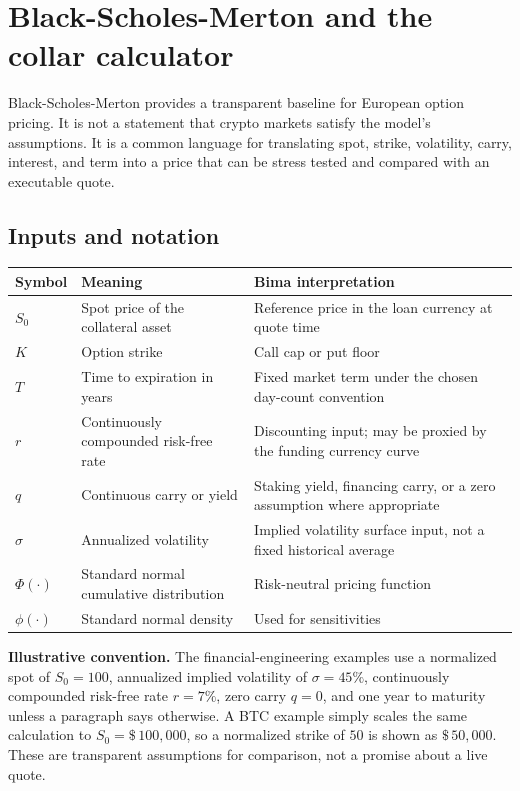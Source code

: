 \documentclass[11pt,oneside]{article}
\newcommand{\dollar}[1]{\$\,#1}
\newcommand{\PhiN}{\Phi}
\newcommand{\phiN}{\phi}
\begin{document}
\section{Black-Scholes-Merton and the collar calculator}

Black-Scholes-Merton provides a transparent baseline for European option pricing. It is not a statement that crypto markets satisfy the model's assumptions. It is a common language for translating spot, strike, volatility, carry, interest, and term into a price that can be stress tested and compared with an executable quote.

\subsection{Inputs and notation}

\begin{center}
\begin{tabularx}{\textwidth}{@{}p{}Y Y@{}}
\toprule
\textbf{Symbol} & \textbf{Meaning} & \textbf{Bima interpretation} \\
\midrule
$S_0$ & Spot price of the collateral asset & Reference price in the loan currency at quote time \\
$K$ & Option strike & Call cap or put floor \\
$T$ & Time to expiration in years & Fixed market term under the chosen day-count convention \\
$r$ & Continuously compounded risk-free rate & Discounting input; may be proxied by the funding currency curve \\
$q$ & Continuous carry or yield & Staking yield, financing carry, or a zero assumption where appropriate \\
$\sigma$ & Annualized volatility & Implied volatility surface input, not a fixed historical average \\
$\PhiN(\cdot)$ & Standard normal cumulative distribution & Risk-neutral pricing function \\
$\phiN(\cdot)$ & Standard normal density & Used for sensitivities \\
\bottomrule
\end{tabularx}
\end{center}

\begin{definitionbox}
\textbf{Illustrative convention.} The financial-engineering examples use a
normalized spot of $S_0=100$, annualized implied volatility of
$\sigma=45\%$, continuously compounded risk-free rate $r=7\%$, zero carry
$q=0$, and one year to maturity unless a paragraph says otherwise. A BTC
example simply scales the same calculation to $S_0=\dollar{100{,}000}$, so a
normalized strike of $50$ is shown as $\dollar{50{,}000}$. These are transparent
assumptions for comparison, not a promise about a live quote.
\end{definitionbox}
\end{document}

